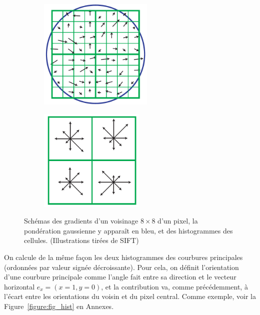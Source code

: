 \documentclass[
	a4paper, %
	10pt, %
	unnumberedsections, %
	twoside, %
]{LTJournalArticle}
\begin{document}
\begin{figure}[H]
	\centering
	\begin{subfigure}[H]{\columnwidth}
		\centering
		\includegraphics[width=0.6\textwidth]{images/lowe_grads.png}
	\end{subfigure}
	\begin{subfigure}[H]{\columnwidth}
		\centering
		\includegraphics[width=0.55\textwidth]{images/lowe_desc.png}
	\end{subfigure}
	\caption{Schémas des gradients d'un voisinage $8 \times 8$ d'un pixel, la pondération
		gaussienne y apparaît en bleu, et des histogrammes des cellules. (Illustrations tirées
		de SIFT) }
	\label{figure:lowe_desc_constr}
\end{figure}

On calcule de la même façon les deux histogrammes des courbures principales
(ordonnées par valeur signée décroissante). Pour cela,
on définit l'orientation d'une courbure principale comme l'angle fait entre sa
direction et le vecteur horizontal $e_x=(x=1, y=0)$, et la contribution va,
comme précédemment, à l'écart entre les orientations du voisin et du pixel central.
Comme exemple, voir la Figure~\ref{figure:fig_hist} en Annexes.
\end{document}
